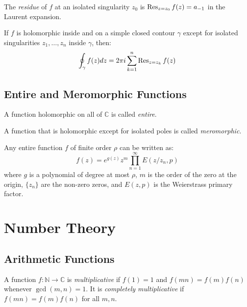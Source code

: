 \begin{definition}[Residue]
The \emph{residue} of $f$ at an isolated singularity $z_0$ is $\operatorname{Res}_{z=z_0} f(z) = a_{-1}$ in the Laurent expansion.
\end{definition}

\begin{theorem}
If $f$ is holomorphic inside and on a simple closed contour $\gamma$ except for isolated singularities $z_1, \ldots, z_n$ inside $\gamma$, then:
\[
\oint_{\gamma} f(z) dz = 2\pi i \sum_{k=1}^n \operatorname{Res}_{z=z_k} f(z)
\]
\end{theorem}

\subsection{Entire and Meromorphic Functions}

\begin{definition}
A function holomorphic on all of $\mathbb{C}$ is called \emph{entire}.
\end{definition}

\begin{definition}
A function that is holomorphic except for isolated poles is called \emph{meromorphic}.
\end{definition}

\begin{theorem}
Any entire function $f$ of finite order $\rho$ can be written as:
\[
f(z) = e^{g(z)} z^m \prod_{n=1}^{\infty} E(z/z_n, p)
\]
where $g$ is a polynomial of degree at most $\rho$, $m$ is the order of the zero at the origin, $\{z_n\}$ are the non-zero zeros, and $E(z,p)$ is the Weierstrass primary factor.
\end{theorem}

\section{Number Theory}

\subsection{Arithmetic Functions}

\begin{definition}
A function $f: \mathbb{N} \to \mathbb{C}$ is \emph{multiplicative} if $f(1) = 1$ and $f(mn) = f(m)f(n)$ whenever $\gcd(m,n) = 1$. It is \emph{completely multiplicative} if $f(mn) = f(m)f(n)$ for all $m,n$.
\end{definition}

